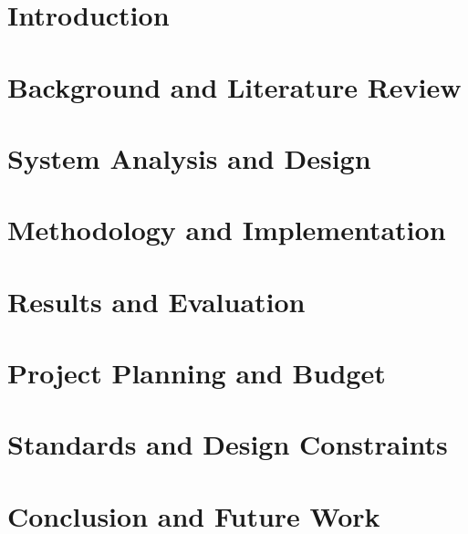 \documentclass[12pt]{report}
\begin{document}
\renewcommand{\thepage}{\roman{page}}







\tableofcontents
{}
\listoffigures
{}
\listoftables

\clearpage
\setcounter{page}{1}
\renewcommand{\thepage}{\arabic{page}}

\chapter{Introduction}\label{cha:introduction}


\chapter{Background and Literature Review}\label{cha:LiteratureReviewU}


\chapter{System Analysis and Design}\label{cha:SystemAnalysisAndDesignU}


\chapter{Methodology and Implementation}\label{cha:MethodologyAndImplementationU}


\chapter{Results and Evaluation}\label{cha:ResultsAndEvaluationU}


\chapter{Project Planning and Budget}\label{cha:cost_time}


\chapter{Standards and Design Constraints}\label{cha:AccreditationComponents}


\chapter{Conclusion and Future Work}\label{cha:ConclusionAndFutureWork}





\appendix

\end{document}
